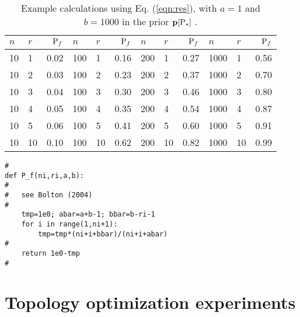 \documentclass[11pt]{article}
\begin{document}
\begin{table}[!h]
\centering
\caption{\label{tab:exp}Example calculations using Eq. (\ref{eqn:res}), with $a=1$ and $b=1000$ in the prior $\p[\P_\ast]$ . }
\begin{tabular}{ll|r|ll|r|ll|r|ll|r|}
$n$  & $r$  & $\P_f$  & $n$   & $r$  & $\P_f$  & $n$    & $r$  & $\P_f$ & $n$    & $r$  & $\P_f$  \\
\hline
10 & 1  & 0.02  & 100 & 1  & 0.16 &  200 & 1  & 0.27  &  1000 & 1  & 0.56\\
10 & 2  & 0.03  & 100 & 2  & 0.23 &  200 & 2  & 0.37 &  1000 & 2  & 0.70 \\
10 & 3  & 0.04 & 100 & 3  & 0.30 &  200 & 3  & 0.46  &  1000 & 3  & 0.80\\
10 & 4  & 0.05  & 100 & 4  & 0.35 &  200 & 4  & 0.54 &  1000 & 4  & 0.87 \\
10 & 5  & 0.06  & 100 & 5  & 0.41 &  200 & 5  & 0.60  &  1000 & 5  & 0.91 \\
10 & 10 & 0.10 & 100 & 10 & 0.62 &  200 & 10 & 0.82 &  1000 & 10 & 0.99
\end{tabular}
\end{table}

\begin{verbatim}
#
def P_f(ni,ri,a,b):
#
#   see Bolton (2004)
#
    tmp=1e0; abar=a+b-1; bbar=b-ri-1
    for i in range(1,ni+1):
        tmp=tmp*(ni+i+bbar)/(ni+i+abar)
#
    return 1e0-tmp
#
\end{verbatim}

\section{Topology optimization experiments}

 
 
\end{document}
